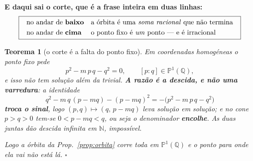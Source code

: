 \documentclass[11pt,a4paper]{article}
\newtheorem{teorema}{Teorema}
\begin{document}
\medskip
\noindent\textbf{E daqui sai o corte, que é a frase inteira em duas linhas:}
\[
\boxed{\;\begin{array}{ll}
\text{no andar de \textbf{baixo}} & \text{a órbita é uma \emph{soma racional} que não
termina}\\[3pt]
\text{no andar de \textbf{cima}} & \text{o ponto fixo é \emph{um} ponto --- e é
irracional}
\end{array}\;}
\]

\begin{teorema}[o corte é a falta do ponto fixo]\label{thm:corte-fixo}
Em coordenadas homogéneas o ponto fixo pede
\[
p^{2}-m\,p\,q-q^{2}=0,\qquad [p:q]\in\mathbb{P}^1(\mathbb{Q}),
\]
e isso não tem solução além da trivial. \textbf{A razão é a descida, e não uma
varredura}: a identidade
\[
\boxed{\;q^{2}-m\,q\,(p-mq)-(p-mq)^{2}=-\bigl(p^{2}-m\,p\,q-q^{2}\bigr)\;}
\]
\textbf{troca o sinal}, logo $(p,q)\mapsto(q,\,p-mq)$ leva solução em solução; e no
cone $p>q>0$ tem-se $0<p-mq<q$, ou seja o denominador \textbf{encolhe}. As duas
juntas dão descida infinita em $\mathbb{N}$, impossível.

\emph{Logo a órbita da Prop.~\ref{prop:orbita} corre toda em $\mathbb{P}^1(\mathbb{Q})$
e o ponto para onde ela vai não está lá.} $\square$
\end{teorema}
\end{document}
